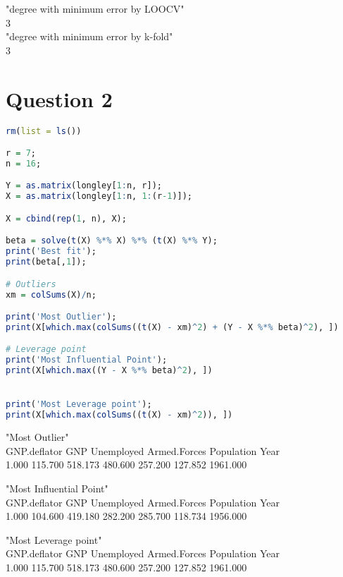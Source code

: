 \documentclass{article}
\begin{document}
"degree with minimum error by LOOCV"\\
3\\

"degree with minimum error by k-fold"\\
3

\section{Question 2}


\begin{lstlisting}[language=R]
rm(list = ls())

r = 7;
n = 16;

Y = as.matrix(longley[1:n, r]);
X = as.matrix(longley[1:n, 1:(r-1)]);

X = cbind(rep(1, n), X);

beta = solve(t(X) %*% X) %*% (t(X) %*% Y);
print('Best fit');
print(beta[,1]);

# Outliers
xm = colSums(X)/n;

print('Most Outlier');
print(X[which.max(colSums((t(X) - xm)^2) + (Y - X %*% beta)^2), ])

# Leverage point
print('Most Influential Point');
print(X[which.max((Y - X %*% beta)^2), ])


print('Most Leverage point');
print(X[which.max(colSums((t(X) - xm)^2)), ])

\end{lstlisting}

"Most Outlier"\\
             GNP.deflator          GNP   Unemployed Armed.Forces   Population	Year \\
       1.000      115.700      518.173      480.600      257.200      127.852   1961.000 

"Most Influential Point"\\
             GNP.deflator          GNP   Unemployed Armed.Forces   Population	Year \\
       1.000      104.600      419.180      282.200      285.700      118.734	1956.000 
        
     
"Most Leverage point"\\
             GNP.deflator          GNP   Unemployed Armed.Forces   Population 	Year \\
       1.000      115.700      518.173      480.600      257.200      127.852 	1961.000
        
\end{document}
